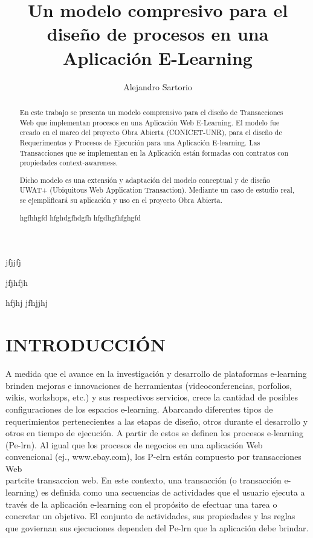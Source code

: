 \documentclass[12 pt,a4paper]{llncs}
\begin{document}
\title{Un modelo compresivo para el diseño de procesos en una Aplicación E-Learning }

\author{Alejandro Sartorio}



jfjjfj

jfjhfjh

hfjhj
jfhjjhj



\begin{abstract}
En este trabajo se presenta un modelo comprensivo para el diseño de Transacciones Web que implementan procesos en una Aplicación Web E-Learning. El modelo fue creado en el marco del proyecto Obra Abierta (CONICET-UNR), para el diseño de Requerimentos y Procesos de Ejecución para una Aplicación E-learning. Las Transacciones que se implementan en la Aplicación están formadas con contratos con propiedades context-awareness.

Dicho modelo es una extensión y adaptación del modelo conceptual y de diseño UWAT+ (Ubiquitous Web Application Transaction). Mediante un caso de estudio real, se ejemplificará su aplicación y uso en el proyecto Obra Abierta. 

\end{abstract}

\begin{abstract}
 
hgfhhgfd
hfghdgfhdgfh
hfgdhgfhfghgfd


\end{abstract}

%

\newpage

\section {INTRODUCCIÓN} \label{intro}

A medida que el avance en la investigación y desarrollo de plataformas e-learning brinden  mejoras e innovaciones de herramientas (videoconferencias, porfolios, wikis, workshops, etc.) y sus respectivos servicios,  crece la cantidad de posibles configuraciones de los espacios e-learning.  Abarcando diferentes tipos de requerimientos pertenecientes a las etapas de diseño, otros durante el desarrollo y otros en tiempo de ejecución. A partir de estos se definen los procesos e-learning (Pe-lrn). Al igual que los procesos de negocios en una aplicación Web convencional (ej., www.ebay.com), los P-elrn están compuesto por transacciones Web \\part{cite}
{transaccion web}. En este contexto, una transacción (o transacción e-learning) es definida como una secuencias de actividades que el usuario ejecuta a través de la aplicación e-learning con el propósito de efectuar una tarea o concretar un objetivo. El conjunto de actividades, sus propiedades y las reglas que goviernan sus ejecuciones dependen del Pe-lrn que la aplicación debe brindar.
\end{document}
